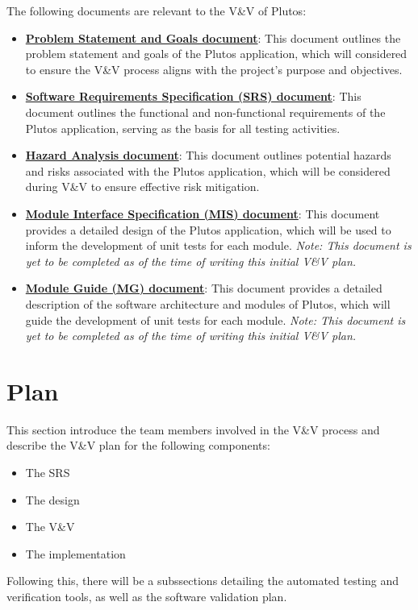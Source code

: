 \documentclass[12pt, titlepage]{article}
\begin{document}
The following documents are relevant to the V\&V of Plutos:
\begin{itemize}
	\item
	\href{https://github.com/PlutosCapstone/Plutos/blob/main/docs/ProblemStatementAndGoals/ProblemStatement.pdf}{\textbf{Problem
	Statement and Goals document}}: This document outlines the problem statement
	and goals of the Plutos application, which will considered to ensure the
	V\&V process aligns with the project's purpose and objectives.
	\item
	\href{https://github.com/PlutosCapstone/Plutos/blob/main/docs/SRS/SRS.pdf}{\textbf{Software
	Requirements Specification (SRS) document}}: This document outlines the
	functional and non-functional requirements of the Plutos application,
	serving as the basis for all testing activities.
	\item
	\href{https://github.com/PlutosCapstone/Plutos/blob/main/docs/HazardAnalysis/HazardAnalysis.pdf}{\textbf{Hazard
	Analysis document}}: This document outlines potential hazards and risks
	associated with the Plutos application, which will be considered during V\&V
	to ensure effective risk mitigation.
	\item
	\href{https://github.com/PlutosCapstone/Plutos/blob/main/docs/Design/SoftDetailedDes/MIS.pdf}{\textbf{Module
	Interface Specification (MIS) document}}: This document provides a detailed
	design of the Plutos application, which will be used to inform the
	development of unit tests for each module. \textit{Note: This document is
	yet to be completed as of the time of writing this initial V\&V plan.}
	\item
	\href{https://github.com/PlutosCapstone/Plutos/blob/main/docs/Design/SoftArchitecture/MG.pdf}{\textbf{Module
	Guide (MG) document}}: This document provides a detailed description of the
	software architecture and modules of Plutos, which will guide the
	development of unit tests for each module. \textit{Note: This document is
	yet to be completed as of the time of writing this initial V\&V plan.}
\end{itemize}

\newpage

\section{Plan}

This section introduce the team members involved in the V\&V process and
describe the V\&V plan for the following components:
\begin{itemize}
	\item The SRS
	\item The design
	\item The V\&V
	\item The implementation
\end{itemize}
Following this, there will be a subssections detailing the automated testing and
verification tools, as well as the software validation plan.
\end{document}
